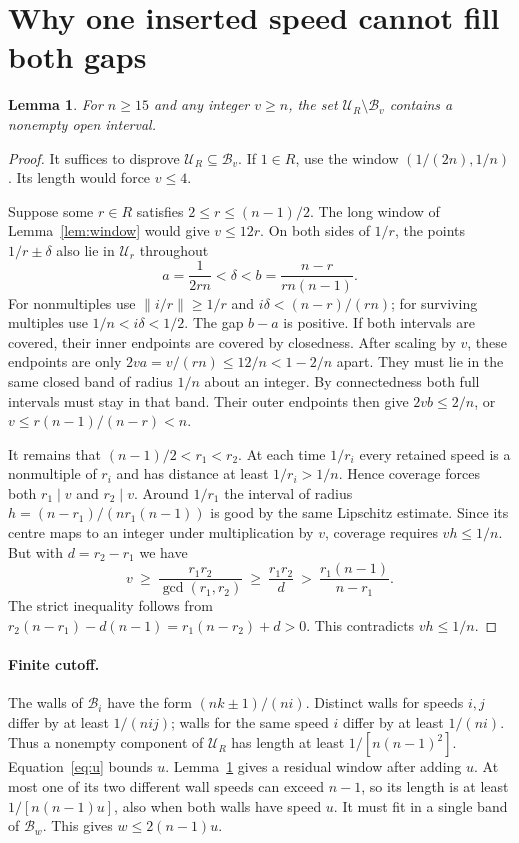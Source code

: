 \documentclass[11pt,a4paper]{article}
\newtheorem{lemma}[theorem]{Lemma}
\newcommand{\dist}[1]{\lVert #1\rVert}
\newcommand{\bad}{\mathcal B}
\newcommand{\good}{\mathcal U}
\begin{document}
\newpage
\section{Why one inserted speed cannot fill both gaps}
\begin{lemma}\label{lem:one}
For $n\ge15$ and any integer $v\ge n$, the set $\good_R\setminus\bad_v$
contains a nonempty open interval.
\end{lemma}
\begin{proof}
It suffices to disprove $\good_R\subseteq\bad_v$. If $1\in R$, use the
window $(1/(2n),1/n)$. Its length would force $v\le4$.

Suppose some $r\in R$ satisfies $2\le r\le(n-1)/2$. The long window of
Lemma~\ref{lem:window} would give $v\le12r$. On both sides of $1/r$,
the points $1/r\pm\delta$ also lie in $\good_r$ throughout
\[
 a=\frac1{2rn}<\delta<b=\frac{n-r}{rn(n-1)}.
\]
For nonmultiples use $\dist{i/r}\ge1/r$ and $i\delta<(n-r)/(rn)$;
for surviving multiples use $1/n<i\delta<1/2$. The gap $b-a$ is positive.
If both intervals are covered, their inner endpoints are covered by
closedness. After scaling by $v$, these endpoints are only
$2va=v/(rn)\le12/n<1-2/n$ apart. They must lie in the same closed band
of radius $1/n$ about an integer. By connectedness both full intervals
must stay in that band. Their outer endpoints then give $2vb\le2/n$,
or $v\le r(n-1)/(n-r)<n$.

It remains that $(n-1)/2<r_1<r_2$. At each time $1/r_i$ every retained
speed is a nonmultiple of $r_i$ and has distance at least $1/r_i>1/n$.
Hence coverage forces both $r_1\mid v$ and $r_2\mid v$. Around $1/r_1$
the interval of radius $h=(n-r_1)/(nr_1(n-1))$ is good by the same
Lipschitz estimate. Since its centre maps to an integer under multiplication
by $v$, coverage requires $vh\le1/n$. But with $d=r_2-r_1$ we have
\[
 v\ \ge\ \frac{r_1r_2}{\gcd(r_1,r_2)}
 \ \ge\ \frac{r_1r_2}{d}
 \ >\ \frac{r_1(n-1)}{n-r_1}.
\]
The strict inequality follows from
$r_2(n-r_1)-d(n-1)=r_1(n-r_2)+d>0$. This contradicts $vh\le1/n$.
\end{proof}

\paragraph{Finite cutoff.}
The walls of $\bad_i$ have the form $(nk\pm1)/(ni)$. Distinct walls for
speeds $i,j$ differ by at least $1/(nij)$; walls for the same speed $i$
differ by at least $1/(ni)$. Thus a nonempty component of $\good_R$
has length at least $1/[n(n-1)^2]$. Equation~\eqref{eq:u} bounds $u$.
Lemma~\ref{lem:one} gives a residual window after adding $u$. At most
one of its two different wall speeds can exceed $n-1$, so its length is
at least $1/[n(n-1)u]$, also when both walls have speed $u$.
It must fit in a single band of $\bad_w$. This gives $w\le2(n-1)u$.
\end{document}
